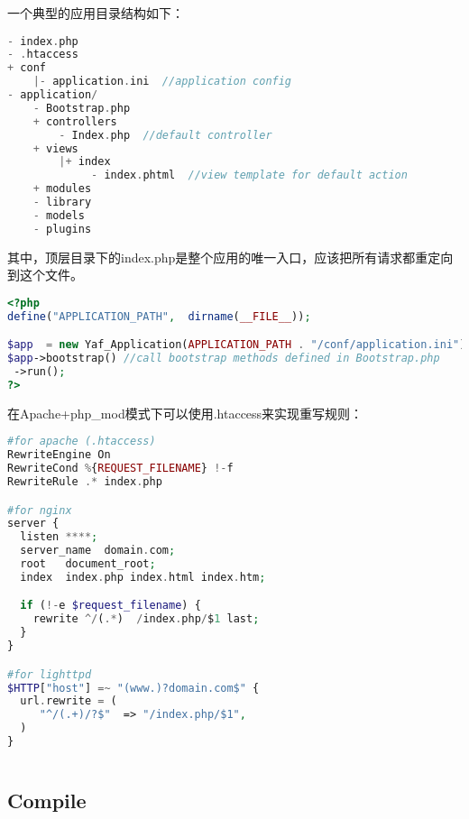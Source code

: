 一个典型的应用目录结构如下：

\begin{lstlisting}[language=PHP]
- index.php 
- .htaccess 
+ conf
    |- application.ini  //application config
- application/
    - Bootstrap.php   
    + controllers
        - Index.php  //default controller
    + views    
        |+ index   
             - index.phtml  //view template for default action
    + modules 
    - library
    - models  
    - plugins 
\end{lstlisting}

其中，顶层目录下的index.php是整个应用的唯一入口，应该把所有请求都重定向到这个文件。




\begin{lstlisting}[language=PHP]
<?php
define("APPLICATION_PATH",  dirname(__FILE__));

$app  = new Yaf_Application(APPLICATION_PATH . "/conf/application.ini");
$app->bootstrap() //call bootstrap methods defined in Bootstrap.php
 ->run();
?>
\end{lstlisting}





在Apache+php\_mod模式下可以使用.htaccess来实现重写规则：

\begin{lstlisting}[language=PHP]
#for apache (.htaccess)
RewriteEngine On
RewriteCond %{REQUEST_FILENAME} !-f
RewriteRule .* index.php

#for nginx
server {
  listen ****;
  server_name  domain.com;
  root   document_root;
  index  index.php index.html index.htm;

  if (!-e $request_filename) {
    rewrite ^/(.*)  /index.php/$1 last;
  }
}

#for lighttpd
$HTTP["host"] =~ "(www.)?domain.com$" {
  url.rewrite = (
     "^/(.+)/?$"  => "/index.php/$1",
  )
}
\end{lstlisting}




\begin{lstlisting}[language=PHP]

\end{lstlisting}





\subsection{Compile}

